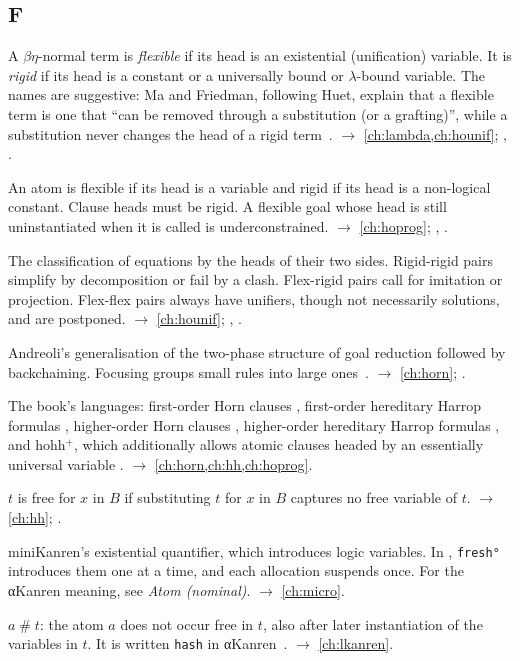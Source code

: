 \subsection*{F}
\begin{glossarylist}
\item[Flexible term, rigid term] A $\beta\eta$-normal term is \emph{flexible} if its head is an existential
  (unification) variable. It is \emph{rigid} if its head is a constant or a universally bound or $\lambda$-bound
  variable. The names are suggestive: Ma and Friedman, following Huet, explain that a flexible term is one that
  \enquote{can be removed through a substitution (or a grafting)}, while a substitution never changes the head of
  a rigid term~\cite{MaFriedman2021}. $\rightarrow$ \cref{ch:lambda,ch:hounif}; , .
\item[Flexible atom, rigid atom, flexible goal] An atom is flexible if its head is a variable and rigid if its head
  is a non-logical constant. Clause heads must be rigid. A flexible goal whose head is still uninstantiated when it
  is called is underconstrained. $\rightarrow$ \cref{ch:hoprog}; , .
\item[Flex-flex, flex-rigid, rigid-rigid] The classification of equations by the heads of their two sides.
  Rigid-rigid pairs simplify by decomposition or fail by a clash. Flex-rigid pairs call for imitation or
  projection. Flex-flex pairs always have unifiers, though not necessarily solutions, and are postponed.
  $\rightarrow$ \cref{ch:hounif}; , .
\item[Focused proof] Andreoli's generalisation of the two-phase structure of goal reduction followed by
  backchaining. Focusing groups small rules into large ones~\cite{Andreoli1992}. $\rightarrow$ \cref{ch:horn};
  .
\item[fohc, fohh, hohc, hohh, hohh$^{+}$] The book's languages: first-order Horn clauses , first-order
  hereditary Harrop formulas , higher-order Horn clauses , higher-order hereditary Harrop
  formulas , and hohh$^+$, which additionally allows atomic clauses headed by an essentially universal
  variable . $\rightarrow$ \cref{ch:horn,ch:hh,ch:hoprog}.
\item[Free for] $t$ is free for $x$ in $B$ if substituting $t$ for $x$ in $B$ captures no free variable of $t$.
  $\rightarrow$ \cref{ch:hh}; .
\item[Fresh, \texttt{fresh°}] miniKanren's existential quantifier, which introduces logic variables. In \micro{},
  \texttt{fresh°} introduces them one at a time, and each allocation suspends once. For the αKanren meaning, see
  \emph{Atom (nominal)}. $\rightarrow$ \cref{ch:micro}.
\item[Freshness constraint] $a\mathbin{\#}t$: the atom $a$ does not occur free in $t$, also after later
  instantiation of the variables in $t$. It is written \texttt{hash} in αKanren~\cite{UrbanPittsGabbay2004}.
  $\rightarrow$ \cref{ch:lkanren}.
\end{glossarylist}

